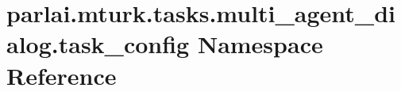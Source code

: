 \hypertarget{namespaceparlai_1_1mturk_1_1tasks_1_1multi__agent__dialog_1_1task__config}{}\section{parlai.\+mturk.\+tasks.\+multi\+\_\+agent\+\_\+dialog.\+task\+\_\+config Namespace Reference}
\label{namespaceparlai_1_1mturk_1_1tasks_1_1multi__agent__dialog_1_1task__config}
